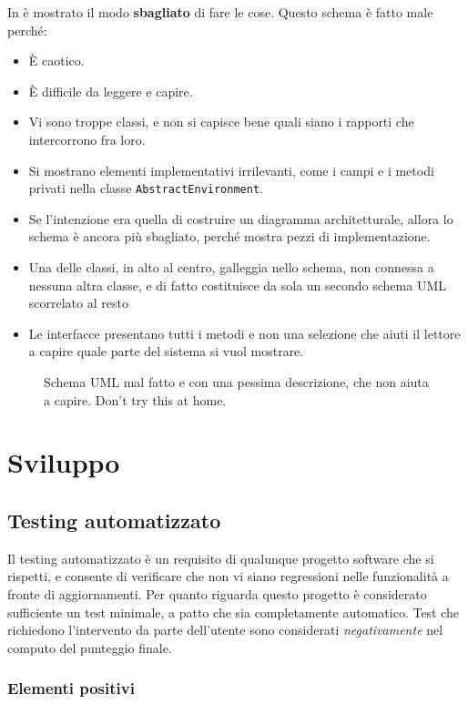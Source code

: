 \documentclass[a4paper,12pt]{report}
\begin{document}
In  è mostrato il modo \textbf{sbagliato} di fare le cose.
%
Questo schema è fatto male perché:
\begin{itemize}
	\item È caotico.
	\item È difficile da leggere e capire.
	\item Vi sono troppe classi, e non si capisce bene quali siano i rapporti che intercorrono fra loro.
	\item Si mostrano elementi implementativi irrilevanti, come i campi e i metodi privati nella classe \texttt{AbstractEnvironment}.
	\item Se l'intenzione era quella di costruire un diagramma architetturale, allora lo schema è ancora più sbagliato, perché mostra pezzi di implementazione.
	\item Una delle classi, in alto al centro, galleggia nello schema, non connessa a nessuna altra classe, e di fatto costituisce da sola un secondo schema UML scorrelato al resto
	\item Le interfacce presentano tutti i metodi e non una selezione che aiuti il lettore a capire quale parte del sistema si vuol mostrare.
\end{itemize}


\begin{figure}
\centering{}
\caption{Schema UML mal fatto e con una pessima descrizione, che non aiuta a capire. Don't try this at home.}
\label{img:badarch}
\end{figure}


\chapter{Sviluppo}
\section{Testing automatizzato}

Il testing automatizzato è un requisito di qualunque progetto software che si rispetti, e consente di verificare che non vi siano regressioni nelle funzionalità a fronte di aggiornamenti.
%
Per quanto riguarda questo progetto è considerato sufficiente un test minimale, a patto che sia completamente automatico.
%
Test che richiedono l'intervento da parte dell'utente sono considerati \textit{negativamente} nel computo del punteggio finale.

\subsection*{Elementi positivi}
\end{document}
